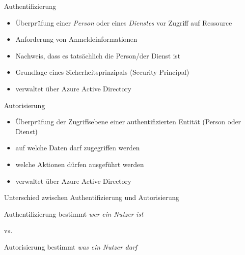 
\begin{flashcard}[Definition]{Authentifizierung}
    \begin{itemize}
        \item Überprüfung einer \emph{Person} oder eines \emph{Dienstes} vor Zugriff auf Ressource
        \item Anforderung von Anmeldeinformationen
        \item Nachweis, dass es tatsächlich die Person/der Dienst ist
        \item Grundlage eines Sicherheitsprinzipals (Security Principal)
        \item verwaltet über Azure Active Directory
    \end{itemize}
\end{flashcard}

\begin{flashcard}[Definition]{Autorisierung}
    \begin{itemize}
        \item Überprüfung der Zugriffsebene einer authentifizierten Entität (Person oder Dienst)
        \item auf welche Daten darf zugegriffen werden
        \item welche Aktionen dürfen ausgeführt werden
        \item verwaltet über Azure Active Directory
    \end{itemize}
\end{flashcard}

\begin{flashcard}[Verstehen]{Unterschied zwischen Authentifizierung und Autorisierung}
    \begin{center}
        Authentifizierung bestimmt \emph{wer ein Nutzer ist}
        \vspace{5mm}

        vs.
        \vspace{5mm}

        Autorisierung bestimmt \emph{was ein Nutzer darf}
    \end{center}
\end{flashcard}

